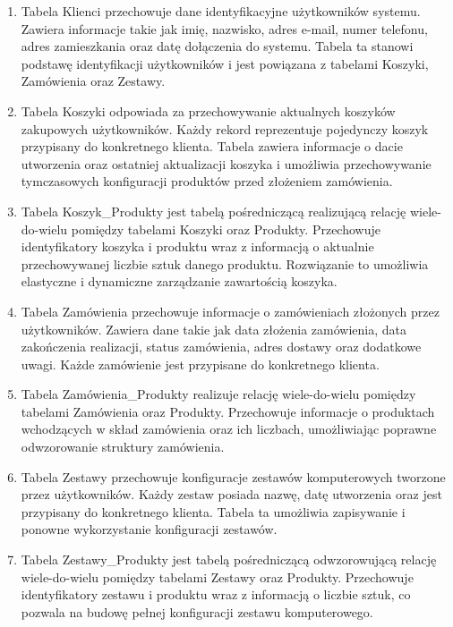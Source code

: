 \documentclass[a4paper,twoside,12pt]{book}
\begin{document}
\begin{enumerate}
    \item Tabela Klienci przechowuje dane identyfikacyjne użytkowników systemu.
    Zawiera informacje takie jak imię, nazwisko, adres e-mail, numer telefonu,
    adres zamieszkania oraz datę dołączenia do systemu. Tabela ta stanowi
    podstawę identyfikacji użytkowników i jest powiązana z tabelami Koszyki,
    Zamówienia oraz Zestawy.

    \item Tabela Koszyki odpowiada za przechowywanie aktualnych koszyków
    zakupowych użytkowników. Każdy rekord reprezentuje pojedynczy koszyk
    przypisany do konkretnego klienta. Tabela zawiera informacje o dacie
    utworzenia oraz ostatniej aktualizacji koszyka i umożliwia przechowywanie
    tymczasowych konfiguracji produktów przed złożeniem zamówienia.

    \item Tabela Koszyk\_Produkty jest tabelą pośredniczącą realizującą relację
    wiele-do-wielu pomiędzy tabelami Koszyki oraz Produkty. Przechowuje
    identyfikatory koszyka i produktu wraz z informacją o aktualnie przechowywanej liczbie sztuk danego
    produktu. Rozwiązanie to umożliwia elastyczne i dynamiczne zarządzanie zawartością
    koszyka.

    \item Tabela Zamówienia przechowuje informacje o zamówieniach złożonych przez
    użytkowników. Zawiera dane takie jak data złożenia zamówienia, data
    zakończenia realizacji, status zamówienia, adres dostawy oraz dodatkowe
    uwagi. Każde zamówienie jest przypisane do konkretnego klienta.

    \item Tabela Zamówienia\_Produkty realizuje relację wiele-do-wielu pomiędzy
    tabelami Zamówienia oraz Produkty. Przechowuje informacje o produktach
    wchodzących w skład zamówienia oraz ich liczbach, umożliwiając poprawne
    odwzorowanie struktury zamówienia.

    \item Tabela Zestawy przechowuje konfiguracje zestawów komputerowych tworzone
    przez użytkowników. Każdy zestaw posiada nazwę, datę utworzenia oraz jest
    przypisany do konkretnego klienta. Tabela ta umożliwia zapisywanie i
    ponowne wykorzystanie konfiguracji zestawów.

    \item Tabela Zestawy\_Produkty jest tabelą pośredniczącą odwzorowującą relację
    wiele-do-wielu pomiędzy tabelami Zestawy oraz Produkty. Przechowuje
    identyfikatory zestawu i produktu wraz z informacją o liczbie sztuk,
    co pozwala na budowę pełnej konfiguracji zestawu komputerowego.
\end{enumerate}
\end{document}
